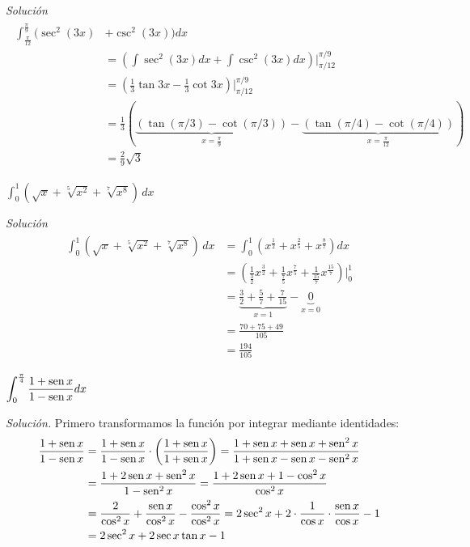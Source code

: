 \begin{parrafonumerado}
\emph{Solución}
\begin{gather*}
\begin{aligned}
  \int_{\frac{\pi }{12}}^{\frac{\pi }{9}}\bigl(\sec ^{2}(3x)&+\csc^{2}(3x)\bigr)dx\\
  &=\left(\int \sec ^{2}(3x)dx+\int \csc ^{2}(3x)dx\right)\Bigg|_{\pi/12}^{\pi/9}\\
  &=\left(\frac{1}{3}\tan 3x-\frac{1}{3}\cot 3x\right)\Bigg|_{\pi/12}^{\pi/9}\\
  &=\frac{1}{3}\left(\underset{x=\frac{\pi}{9}}
    {\underbrace{\left(\tan(\pi/3)-\cot(\pi/3)\right)}}
  -\underset{x=\frac{\pi }{12}}{\underbrace{(\tan(\pi/4)-\cot(\pi/4))}}\right)\\
  &=\frac{2}{9}\sqrt{3}
\end{aligned}
\end{gather*}

\item $\displaystyle{\int_{0}^{1}\left(\sqrt{x}+\sqrt[5]{x^{2}}+\sqrt[7]{x^{8}}\right)\,dx}$

\vspace{\baselineskip}

\emph{Solución}
\begin{gather*}
\begin{aligned}
  \int_{0}^{1}\left( \sqrt{x}+\sqrt[5]{x^{2}}+\sqrt[7]{x^{8}} \right) \,dx&=\int_{0}^{1} \left( x^{\frac{1}{2}}+x^{\frac{2}{5}}+x^{\frac{8}{7}}\right)dx \\
  &=\left(\frac{1}{\frac{3}{2}}x^{\frac{3}{2}}+\frac{1}{\frac{7}{5}}x^{\frac{7}{5}}+\frac{1}{\frac{15}{7}}x^{\frac{15}{7}}\right)\bigg|_{0}^{1}\\
  &=\underset{x=1}{\underbrace{\frac{3}{2}+\frac{5}{7}+\frac{7}{15}}}-\underset{x=0}{\underbrace{0}}\\[0.2em]
  &=\frac{70+75+49}{105}\\
  &=\frac{194}{105}
\end{aligned}
\end{gather*}

\item $\displaystyle{\int_{0}^{\frac{\pi }{4}}\frac{1+\operatorname{sen}x}{1-\operatorname{sen}x}dx}$

\vspace{\baselineskip}

\emph{Solución.} Primero transformamos la función por integrar mediante identidades:
\begin{gather*}
\begin{aligned}
  \frac{1+\operatorname{sen} x}{1-\operatorname{sen} x}&=\frac{1+\operatorname{sen} x}{1-\operatorname{sen} x}\cdot \left(\frac{1+\operatorname{sen} x}{1+\operatorname{sen} x}\right)=\frac{1+\operatorname{sen} x+\operatorname{sen} x+\operatorname{sen} ^{2}x}{1+\operatorname{sen} x-\operatorname{sen} x-\operatorname{sen} ^{2}x}\\
  &=\frac{1+2\operatorname{sen} x+\operatorname{sen} ^{2}x}{1-\operatorname{sen} ^{2}x}=\frac{1+2\operatorname{sen} x+1-\cos ^{2}x}{\cos ^{2}x}\\
  &=\frac{2}{\cos ^{2}x}+\frac{\operatorname{sen} x}{\cos ^{2}x}-\frac{\cos ^{2}x}{\cos ^{2}x}=2\sec ^{2}x+2\cdot \frac{1}{\cos x}\cdot \frac{\operatorname{sen} x}{\cos x}-1\\
  &=2\sec^{2}x+2\sec x \tan x-1
\end{aligned}
\end{gather*}


\end{parrafonumerado}
